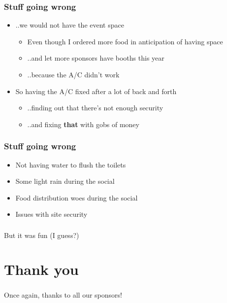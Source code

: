 \documentclass[t]{beamer}
\begin{document}
\begin{frame}
	\frametitle{Stuff going wrong}
	\vfill
	\begin{itemize}
		\item ..we would not have the event space
		\begin{itemize}
			\item Even though I ordered more food in anticipation of having space
			\item ..and let more sponsors have booths this year
			\item ..because the A/C didn't work
		\end{itemize}
		\item So having the A/C fixed after a lot of back and forth
		\begin{itemize}
			\item ..finding out that there's not enough security
			\item ..and fixing \textbf{that} with gobs of money
		\end{itemize}
	\end{itemize}
	\vfill
\end{frame}

\begin{frame}
	\frametitle{Stuff going wrong}
	\vfill
	\begin{itemize}
		\item Not having water to flush the toilets
		\item Some light rain during the social
		\item Food distribution woes during the social
		\item Issues with site security
	\end{itemize}
	\vfill
\end{frame}

\begin{frame}
	\frametitle{}
	\begin{center}
	\vfill
		But it was fun (I guess?)
	\vfill
	\end{center}
\end{frame}

\section{Thank you}

\begin{frame}
	\frametitle{}
	\begin{center}
	\vfill
	Once again, thanks to all our sponsors!
	\vfill
	\end{center}
\end{frame}
\end{document}
